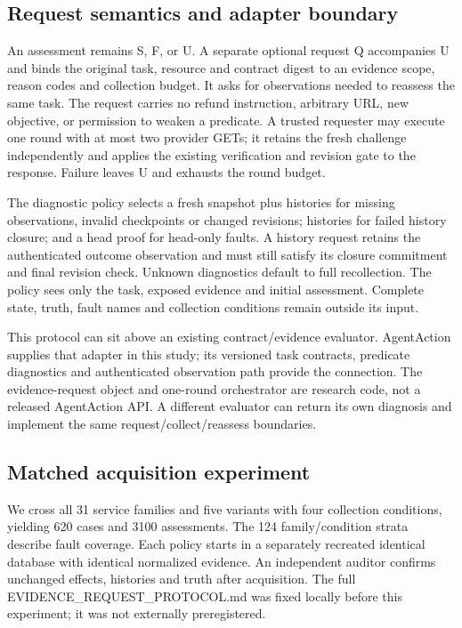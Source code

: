 \documentclass[11pt]{article}
\begin{document}
\subsection{Request semantics and adapter boundary}
An assessment remains S, F, or U. A separate optional request Q accompanies U and binds the original task, resource and contract digest to an evidence scope, reason codes and collection budget. It asks for observations needed to reassess the same task. The request carries no refund instruction, arbitrary URL, new objective, or permission to weaken a predicate. A trusted requester may execute one round with at most two provider GETs; it retains the fresh challenge independently and applies the existing verification and revision gate to the response. Failure leaves U and exhausts the round budget.

The diagnostic policy selects a fresh snapshot plus histories for missing observations, invalid checkpoints or changed revisions; histories for failed history closure; and a head proof for head-only faults. A history request retains the authenticated outcome observation and must still satisfy its closure commitment and final revision check. Unknown diagnostics default to full recollection. The policy sees only the task, exposed evidence and initial assessment. Complete state, truth, fault names and collection conditions remain outside its input.

This protocol can sit above an existing contract/evidence evaluator. AgentAction supplies that adapter in this study; its versioned task contracts, predicate diagnostics and authenticated observation path provide the connection. The evidence-request object and one-round orchestrator are research code, not a released AgentAction API. A different evaluator can return its own diagnosis and implement the same request/collect/reassess boundaries.

\subsection{Matched acquisition experiment}
We cross all 31 service families and five variants with four collection conditions, yielding 620 cases and 3100 assessments. The 124 family/condition strata describe fault coverage. Each policy starts in a separately recreated identical database with identical normalized evidence. An independent auditor confirms unchanged effects, histories and truth after acquisition. The full EVIDENCE\_REQUEST\_PROTOCOL.md was fixed locally before this experiment; it was not externally preregistered.
\end{document}
